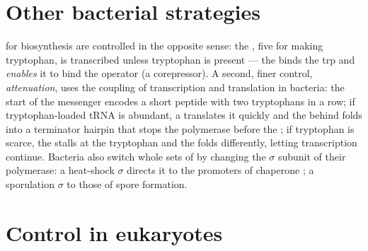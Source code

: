 \section{Other bacterial strategies}

\begin{proposition}\label{prop:b1:expression-control:trp}
 for biosynthesis are controlled in the opposite sense: the
\emph{}, five  for making tryptophan, is transcribed
unless tryptophan is present --- the  binds the trp
 and \emph{enables} it to bind the operator (a corepressor).
A second, finer control, \emph{attenuation}, uses the coupling of
transcription and translation in bacteria: the start of the messenger
encodes a short peptide with two tryptophans in a row; if
tryptophan-loaded tRNA is abundant, a  translates it quickly
and the  behind folds into a terminator hairpin that stops the
polymerase before the ; if tryptophan is scarce, the 
stalls at the tryptophan  and the  folds differently,
letting transcription continue. Bacteria also switch whole sets of
 by changing the $\sigma$ subunit of their polymerase: a
heat-shock $\sigma$ directs it to the promoters of chaperone ; a
sporulation $\sigma$ to those of spore formation.
\end{proposition}

\section{Control in eukaryotes}

